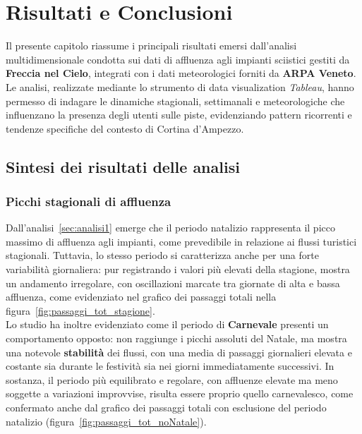 
\chapter{Risultati e Conclusioni}
\label{cha:Conclusioni}

Il presente capitolo riassume i principali risultati emersi dall’analisi multidimensionale condotta sui dati di affluenza agli impianti sciistici gestiti da \textbf{Freccia nel Cielo}, integrati con i dati meteorologici forniti da \textbf{ARPA Veneto}.  
Le analisi, realizzate mediante lo strumento di data visualization \textit{Tableau}, hanno permesso di indagare le dinamiche stagionali, settimanali e meteorologiche che influenzano la presenza degli utenti sulle piste, evidenziando pattern ricorrenti e tendenze specifiche del contesto di Cortina d’Ampezzo.

\section{Sintesi dei risultati delle analisi}


\subsection*{Picchi stagionali di affluenza}
Dall’analisi~\ref{sec:analisi1} emerge che il periodo natalizio rappresenta il picco massimo di affluenza agli impianti, come prevedibile in relazione ai flussi turistici stagionali.  
Tuttavia, lo stesso periodo si caratterizza anche per una forte variabilità giornaliera: pur registrando i valori più elevati della stagione, mostra un andamento irregolare, con oscillazioni marcate tra giornate di alta e bassa affluenza, come evidenziato nel grafico dei passaggi totali nella figura~\ref{fig:passaggi_tot_stagione}.\\

Lo studio ha inoltre evidenziato come il periodo di \textbf{Carnevale} presenti un comportamento opposto: non raggiunge i picchi assoluti del Natale, ma mostra una notevole \textbf{stabilità} dei flussi, con una media di passaggi giornalieri elevata e costante sia durante le festività sia nei giorni immediatamente successivi.  
In sostanza, il periodo più equilibrato e regolare, con affluenze elevate ma meno soggette a variazioni improvvise, risulta essere proprio quello carnevalesco, come confermato anche dal grafico dei passaggi totali con esclusione del periodo natalizio (figura~\ref{fig:passaggi_tot_noNatale}). \\

